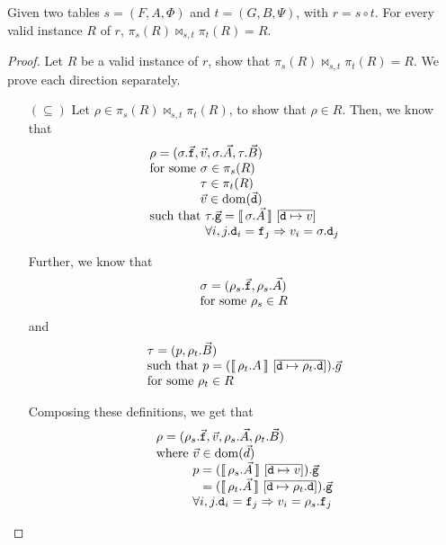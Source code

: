 \begin{proposition}
  \label{prop:join-proj}
  Given two tables $s = (F,A,\Phi)$ and $t = (G,B, \Psi)$, with
  $r = s \circ t$. For every valid instance $R$ of $r$,
  $\pi_s(R) \bowtie_{s,t} \pi_t(R) = R$.
\end{proposition}

\begin{proof}
  Let $R$ be a valid instance of $r$, show that
  $\pi_s(R) \bowtie_{s,t} \pi_t(R) = R$. We prove each direction
  separately.
  \begin{enumerate}[align=left]
  \item[$(\subseteq)$] Let $\rho \in \pi_s(R) \bowtie_{s,t} \pi_t(R)$,
    to show that $\rho \in R$. Then, we know that
    \[\begin{array}l
        \rho = (\sigma.\vec{\var f}, \vec v, \sigma.\vec A, \tau.\vec B)\\
        \text{for some } \sigma \in \pi_s(R)\\
        \phantom{\text{for some }}\tau \in \pi_t(R)\\
        \phantom{\text{for some }} \vec v \in \dom(\vec{\var d})\\ 
        \text{such that } \tau.\vec{\var g} = \bracbb{\sigma.\vec A}~[\overline{\var d \mapsto v}] \\
        \phantom{\text{such that }} \forall i,j. \var d_i = \var f_j \Rightarrow v_i = \sigma.\var d_j
      \end{array} \]

    Further, we know that
    \[\begin{array}l
        \sigma = (\rho_s.\vec{\var f}, \rho_s.\vec A)\\
        \text{for some } \rho_s \in R\\
      \end{array}
    \]
    and
    \[\begin{array}l  
        \tau = (p, \rho_t.\vec B) \\
        \text{such that } p = (\bracbb{\rho_t.A}~[\overline{\var d \mapsto \rho_t.\var d}]).\vec g \\
        \text{for some } \rho_t \in R
      \end{array}\]

    Composing these definitions, we get that
    \[\begin{array}l
        \rho = (\rho_s.\vec{\var f}, \vec v, \rho_s.\vec A, \rho_t.\vec B) \\
        \text{where } \vec v \in \dom(\vec d)\\
        \phantom{\text{where }} p = (\bracbb{\rho_s.\vec A}~[\overline{\var d \mapsto v}]).\vec{\var g}\\
        \phantom{\text{where } p} = (\bracbb{\rho_t.\vec A}~[\overline{\var d \mapsto \rho_t.\var d}]).\vec{\var g} \\
        \phantom{\text{where }} \forall i,j. \var d_i = \var f_j \Rightarrow v_i = \rho_s.\var f_j
      \end{array}\]
    

\end{enumerate}
\end{proof}
